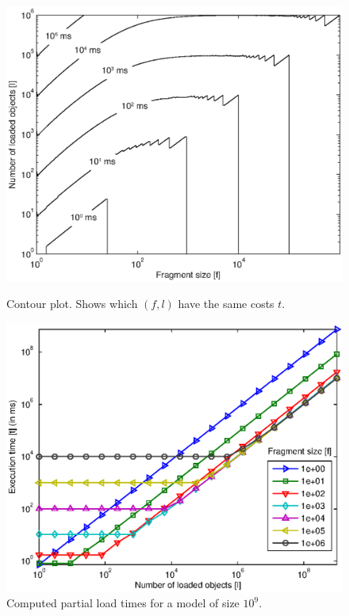\begin{figure}[ht]
\begin{minipage}[b]{0.48\linewidth}
\centering
\includegraphics[width=\linewidth]{figures/theoryContour}
\caption{Contour plot. Shows which $(f,l)$ have the same costs $t$.}
\label{fig:theoryContour}
\end{minipage}
\hspace{0.02\linewidth}
\begin{minipage}[b]{0.48\linewidth}
\centering
\includegraphics[width=\linewidth]{figures/theoryTimesLarge}
\caption{Computed partial load times for a model of size $10^9$.}
\label{fig:theoryTimesLarge}
\end{minipage}
\end{figure}